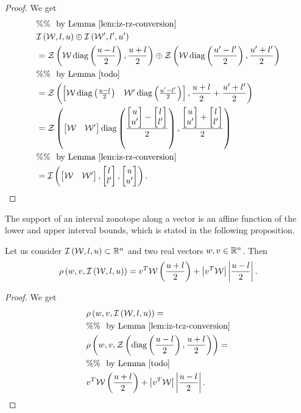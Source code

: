 %
\begin{proof}
We get
%
\begin{align*}
  & \%\%~~\text{by Lemma~\ref{lem:iz-rz-conversion}}\\
  &
  \mathit{\operatorname{\mathcal{I}}}\left(\mathcal{W},l,u\right)\oplus \mathit{\operatorname{\mathcal{I}}}\left(\mathcal{W}^\prime,l^\prime,u^\prime\right)\\
  & =
  \mathit{\mathcal{Z}}\left(\mathcal{W}\operatorname{diag}\left(\frac{u-l}{2}\right),\frac{u+l}{2}\right)\oplus \mathit{\mathcal{Z}}\left(\mathcal{W}\operatorname{diag}\left(\frac{u^\prime-l^\prime}{2}\right),\frac{u^\prime+l^\prime}{2}\right)\\
  & \%\%~~\text{by Lemma~\ref{todo}}\\
  &= \mathit{\mathcal{Z}}\left(\left[\begin{matrix}\mathcal{W}\operatorname{diag}\left(\frac{u-l}{2}\right) &
      \mathcal{W}^\prime\operatorname{diag}\left(\frac{u^\prime-l^\prime}{2}\right)\end{matrix}\right],\frac{u+l}{2}+\frac{u^\prime+l^\prime}{2}\right)\\
  & = \mathit{\mathcal{Z}}\left(\left[\begin{matrix}
      \mathcal{W} & \mathcal{W}^\prime
      \end{matrix}\right]
    \operatorname{diag}\left(
      \frac{
        \left[\begin{matrix}
u\\u^\prime
          \end{matrix}\right]-\left[\begin{matrix}
l\\l^\prime
          \end{matrix}\right]
      }{2}
    \right)
    ,\frac{
        \left[\begin{matrix}
u\\u^\prime
          \end{matrix}\right]+\left[\begin{matrix}
l\\l^\prime
          \end{matrix}\right]
    }{2}\right)\\
  & \%\%~~\text{by Lemma~\ref{lem:iz-rz-conversion}}\\
  & = \mathit{\operatorname{\mathcal{I}}}\left(\left[\begin{matrix}\mathcal{W} &
    \mathcal{W}^\prime\end{matrix}\right],\left[\begin{matrix}l\\l^\prime\end{matrix}\right],\left[\begin{matrix}u\\u^\prime\end{matrix}\right]\right).~~~~~\qedhere
\end{align*}
\end{proof}
%
The support of an interval zonotope along a vector is an affine
function of the lower and upper interval bounds, which is stated in
the following proposition.
%
\begin{lemma}
Let us consider $\mathit{\operatorname{\mathcal{I}}}\left(\mathcal{W},l,u\right)\subset\mathbb{R}^n$ and
two real vectors $w,v\in\mathbb{R}^n$.  Then
%
\[
\rho\left(w,v,\mathit{\operatorname{\mathcal{I}}}\left(\mathcal{W},l,u\right)\right)=v^T\mathcal{W}\left(\frac{u+l}{2}\right)+\left|v^T\mathcal{W}\right|\left|\frac{u-l}{2}\right|.
\]
%
\end{lemma}
%
\begin{proof}
We get
%
\begin{align*}
  & \rho\left(w,v,\mathit{\operatorname{\mathcal{I}}}\left(\mathcal{W},l,u\right)\right) = \\
  & \%\%~~\text{by Lemma~\ref{lem:iz-tcz-conversion}}\\
  & \rho\left(w,v,\mathit{\mathcal{Z}}\left(\operatorname{diag}\left(\frac{u-l}{2}\right),\frac{u+l}{2}\right)\right)=\\
  & \%\%~~\text{by Lemma~\ref{todo}}\\
  & v^T\mathcal{W}\left(\frac{u+l}{2}\right)+\left|v^T\mathcal{W}\right|\left|\frac{u-l}{2}\right|.
\end{align*}
%
\end{proof}
